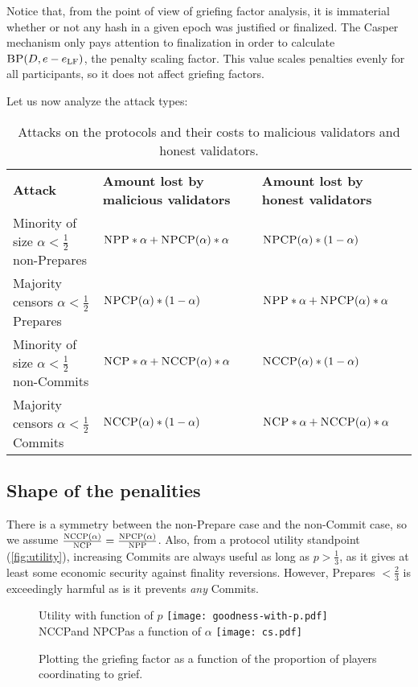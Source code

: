 \documentclass[12pt, final]{article}
\newcommand{\epoch}{\ensuremath{e}\space}
\newcommand{\epochLF}{\ensuremath{\epoch_{\textnormal{LF}}}\space}
\newcommand{\BP}{\textsc{BP}\space}
\newcommand{\NCP}{\textsc{NCP}\space}
\newcommand{\NCCP}{\textsc{NCCP}\space}
\newcommand{\NPP}{\textsc{NPP}\space}
\newcommand{\NPCP}{\textsc{NPCP}\space}
\begin{document}
Notice that, from the point of view of griefing factor analysis, it is immaterial whether or not any hash in a given epoch was justified or finalized. The Casper mechanism only pays attention to finalization in order to calculate $\BP(D, \epoch - \epochLF)$, the penalty scaling factor. This value scales penalties evenly for all participants, so it does not affect griefing factors.

Let us now analyze the attack types:



\begin{table}
\centering
    \renewcommand{\arraystretch}{2}
    \begin{tabular}{l l l }
    \textbf{Attack} & \textbf{Amount lost by malicious validators}  & \textbf{Amount lost by honest validators} \\
    Minority of size $\alpha < \frac{1}{2}$ non-Prepares & $\NPP * \alpha + \NPCP(\alpha) * \alpha$ & $\NPCP(\alpha) * (1-\alpha)$ \\
    Majority censors $\alpha < \frac{1}{2}$ Prepares & $\NPCP(\alpha) * (1-\alpha)$ & $\NPP * \alpha + \NPCP(\alpha) * \alpha$ \\
    Minority of size $\alpha < \frac{1}{2}$ non-Commits & $\NCP * \alpha + \NCCP(\alpha) * \alpha$ & $\NCCP(\alpha) * (1-\alpha)$ \\
    Majority censors $\alpha < \frac{1}{2}$ Commits & $\NCCP(\alpha) * (1-\alpha)$ & $\NCP * \alpha + \NCCP(\alpha) * \alpha$ \\
    \end{tabular}
    \caption{Attacks on the protocols and their costs to malicious validators and honest validators.}
\end{table}

\subsection{Shape of the penalities}
There is a symmetry between the non-Prepare case and the non-Commit case, so we assume $\frac{\NCCP(\alpha)}{\NCP} = \frac{\NPCP(\alpha)}{\NPP}$. Also, from a protocol utility standpoint (\ref{fig:utility}), increasing Commits are always useful as long as $p > \frac{1}{3}$, as it gives at least some economic security against finality reversions.  However, Prepares $< \frac{2}{3}$ is exceedingly harmful as is it prevents \emph{any} Commits.



\begin{figure}[h!bt]
	\centering

	Utility with function of $p${ 	\texttt{[image: goodness-with-p.pdf]} \label{fig:utility} }
	\NCCP and \NPCP as a function of $\alpha${ 	\texttt{[image: cs.pdf]} \label{fig:collectivepenalties} }
	
	\caption{Plotting the griefing factor as a function of the proportion of players coordinating to grief.}
	\label{fig:GF}
\end{figure}
\end{document}
